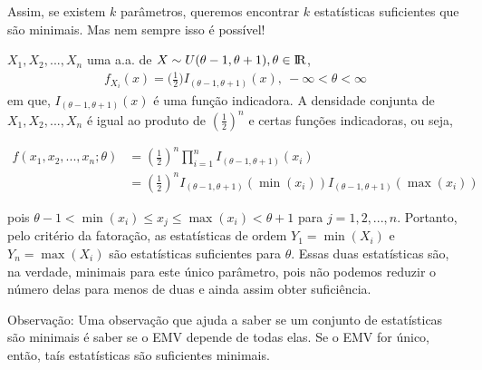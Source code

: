 \documentclass[12pt]{beamer}
\begin{document}
\begin{frame}{}
\begin{block}{}
\justifying
Assim, se existem $k$ parâmetros, queremos encontrar $k$ estatísticas suficientes que são minimais. Mas nem sempre isso é possível!
\end{block}
\pause
\begin{block}{}
\justifying
$X_1, X_2, ..., X_n$ uma a.a. de $X\sim U(\theta - 1, \theta + 1), \theta\in\rm I\!R$, 
\begin{align*}
    f_{X_{i}}(x)=\Big(\frac{1}{2}\Big)I_{(\theta - 1, \theta + 1)}(x),~-\infty<\theta<\infty
\end{align*}
em que, $I_{(\theta - 1, \theta + 1)}(x)$ é uma função indicadora. A densidade conjunta de $X_1, X_2, ..., X_n$ é igual ao produto de $\left(\frac{1}{2}\right)^n$ e certas funções indicadoras, ou seja,

\begin{align*}
f(x_1, x_2, ..., x_n; \theta) &= \left(\frac{1}{2}\right)^n \prod_{i=1}^{n} I_{(\theta - 1, \theta + 1)}(x_{i}) \\
&= \left(\frac{1}{2}\right)^n I_{(\theta - 1, \theta + 1)}\left(\min(x_i)\right) I_{(\theta - 1, \theta + 1)}\left(\max(x_i)\right)
\end{align*}
\end{block}
\end{frame}

\begin{frame}{}
\begin{block}{}
\justifying
pois $\theta - 1 < \min(x_i) \leq x_j \leq \max(x_i) < \theta + 1$ para $j = 1, 2, ..., n$. Portanto, pelo critério da fatoração, as estatísticas de ordem $Y_1 = \min(X_i)$ e $Y_n = \max(X_i)$ são estatísticas suficientes para $\theta$. Essas duas estatísticas são, na verdade, minimais para este único parâmetro, pois não podemos reduzir o número delas para menos de duas e ainda assim obter suficiência.
\end{block}
\pause
\begin{block}{Observação:}
\justifying
Uma observação que ajuda a saber se um conjunto de estatísticas são minimais é saber se o EMV depende de todas elas. Se o EMV for único, então, taís estatísticas são suficientes minimais.
\end{block}
\end{frame}
\end{document}
